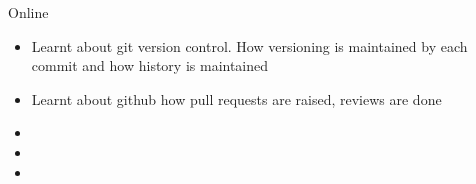 \documentclass[10pt,a4paper,ragged2e]{altacv}
\begin{document}
 {Online}
\begin{itemize}
\item {Learnt about git version control. How versioning is maintained by each commit and how history is maintained}
\smallskip
\item Learnt about github how pull requests are raised, reviews are done
\end{itemize}



\smallskip
     
\smallskip
{}   
\smallskip

\smallskip
\smallskip
\begin{itemize}
\item {}
\smallskip
\item {}
\smallskip
\item {}
\end{itemize}

\clearpage


\nocite{*}






\end{document}
